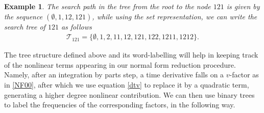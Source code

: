 \documentclass[%
11pt,  reqno]{amsart}
\newcommand{\5}{\textup{V}}
\newcommand{\noi}{\noindent}
\newtheorem{example}{Example}
\theoremstyle{remark}
\newcommand{\TT}{\mathcal{T}}
\numberwithin{equation}{section}
\numberwithin{theorem}{section}
\begin{document}
\begin{example}
\noi
The search path in the tree from the root to the node $121$ is given by the sequence $(\emptyset, 1, 12, 121)$, while using the set representation, we can write the search tree of $121$ as follows
\begin{align}
\TT_{121}
=
\{
\emptyset, 
1, 2, 11, 12, 121, 122, 1211, 1212
\}
.
\end{align}

\end{example}

\medskip 



The tree structure defined above and its word-labelling will help in keeping track of the nonlinear terms appearing in our normal form reduction procedure. Namely, after an integration by parts step, a time derivative falls on a $v$-factor as in \eqref{NF00}, after which we use equation \eqref{dtv} to replace it by a quadratic term, generating a higher degree nonlinear contribution. We can then use binary trees to label the frequencies of the corresponding factors, in the following way. 
\end{document}

